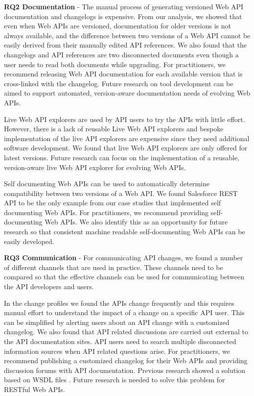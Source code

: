 \documentclass[conference]{IEEEtran}
\begin{document}
\textbf{RQ2 Documentation} - The manual process of generating versioned Web API documentation and changelogs is expensive. From our analysis, we showed that even when Web APIs are  versioned, documentation for older versions is not always available, and the difference between two versions of a Web API cannot be easily derived from their manually edited API references. We also found that the changelogs and API references are two disconnected documents even though a user needs to read both documents while upgrading. For practitioners, we recommend releasing Web API documentation for each available version that is cross-linked with the changelog. Future research on tool development can be aimed to support automated, version-aware documentation needs of evolving Web APIs.

Live Web API explorers are used by API users to try the APIs with little effort. However, there is a lack of reusable Live Web API explorers and bespoke implementation of the live API explorers are expensive since they need additional software development. We found that live Web API explorers are only offered for latest versions. Future research can focus on the implementation of a reusable, version-aware live Web API explorer for evolving Web APIs.

Self documenting Web APIs can be used to automatically determine compatibility between two versions of a Web API. We found Salesforce REST API to be the only example from our case studies that implemented self documenting Web APIs. For practitioners, we recommend providing self-documenting Web APIs. We also identify this as an opportunity for future research so that consistent machine readable self-documenting Web APIs can be easily developed.

\textbf{RQ3 Communication} - For communicating API changes, we found a number of different channels that are used in practice. These channels need to be compared so that the effective channels can be used for communicating between the API developers and users.

In the change profiles we found the APIs change frequently and this requires manual effort to understand the impact of a change on a specific API user. This can be simplified by alerting users about an API change with a customized changelog. We also found that API related discussions are carried out external to the API documentation sites. API users need to search multiple disconnected information sources when API related questions arise. For practitioners, we recommend publishing a customized changelog for their Web APIs and providing discussion forums with API documentation. Previous research showed a solution based on WSDL files \cite{le2008synchronizing}. Future research is needed to solve this problem for RESTful Web APIs.
\end{document}
